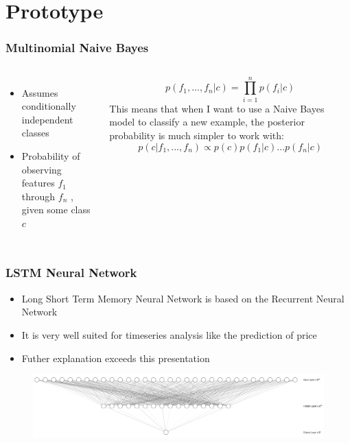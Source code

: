 \documentclass{beamer}
\begin{document}

\section{Prototype}

\begin{frame}
\frametitle{Multinomial Naive Bayes}
\begin{columns}[c] %

\begin{itemize}
\item Assumes conditionally independent classes
\item Probability of observing features \(f_1\)  \\
through \(f_n\) , given some class \(c\)
\end{itemize}

\begin{equation}
p(f_1,..., f_n|c) = \prod_{i=1}^n p(f_i|c)
\end{equation}
This means that when I want to use a Naive Bayes model to classify a new example, the posterior probability is much simpler to work with:
\begin{equation}
p(c|f_1,...,f_n) \propto p(c)p(f_1|c)...p(f_n|c)
\end{equation}
\end{columns}
\end{frame}

\begin{frame}
\frametitle{LSTM Neural Network}
\begin{itemize}
\item Long Short Term Memory Neural Network is based on the Recurrent Neural Network
\item It is very well suited for timeseries analysis like the prediction of price
\item Futher explanation exceeds this presentation
\end{itemize}
\begin{figure}
\includegraphics[width=0.8\linewidth]{photo/nn}
\end{figure}
\end{frame}
\end{document}
